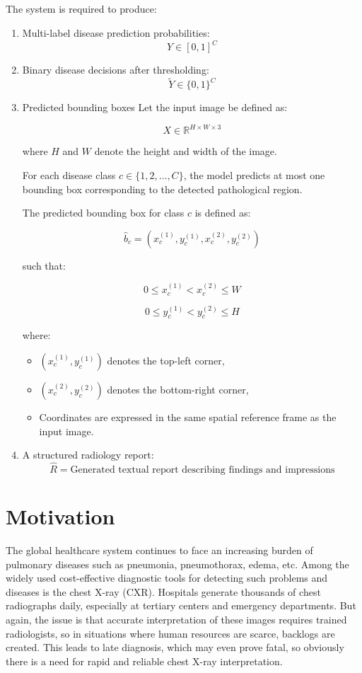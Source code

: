 The system is required to produce:

\begin{enumerate}
    \item Multi-label disease prediction probabilities:
    \[
    \hat{Y} \in [0,1]^{C}
    \]

    \item Binary disease decisions after thresholding:
    \[
    \tilde{Y} \in \{0,1\}^{C}
    \]

    \item Predicted bounding boxes
    Let the input image be defined as:

\[
X \in \mathbb{R}^{H \times W \times 3}
\]

where \(H\) and \(W\) denote the height and width of the image.

For each disease class \(c \in \{1, 2, \dots, C\}\), the model predicts at most one bounding box corresponding to the detected pathological region.

The predicted bounding box for class \(c\) is defined as:

\[
\hat{b}_c = \left( x_c^{(1)}, y_c^{(1)}, x_c^{(2)}, y_c^{(2)} \right)
\]

such that:

\[
0 \leq x_c^{(1)} < x_c^{(2)} \leq W
\]

\[
0 \leq y_c^{(1)} < y_c^{(2)} \leq H
\]

where:

\begin{itemize}
    \item \( (x_c^{(1)}, y_c^{(1)}) \) denotes the top-left corner,
    \item \( (x_c^{(2)}, y_c^{(2)}) \) denotes the bottom-right corner,
    \item Coordinates are expressed in the same spatial reference frame as the input image.
\end{itemize}

    
    \item A structured radiology report:
    \[
    \hat{R} = \text{Generated textual report describing findings and impressions}
    \]
\end{enumerate}

\section{Motivation}

The global healthcare system continues to face an increasing burden of pulmonary diseases such as pneumonia, pneumothorax, edema, etc. Among the widely used cost-effective diagnostic tools for detecting such problems and diseases is the chest X-ray (CXR). Hospitals generate thousands of chest radiographs daily, especially at tertiary centers and emergency departments. But again, the issue is that accurate interpretation of these images requires trained radiologists, so in situations where human resources are scarce, backlogs are created. This leads to late diagnosis, which may even prove fatal, so obviously there is a need for rapid and reliable chest X-ray interpretation.

